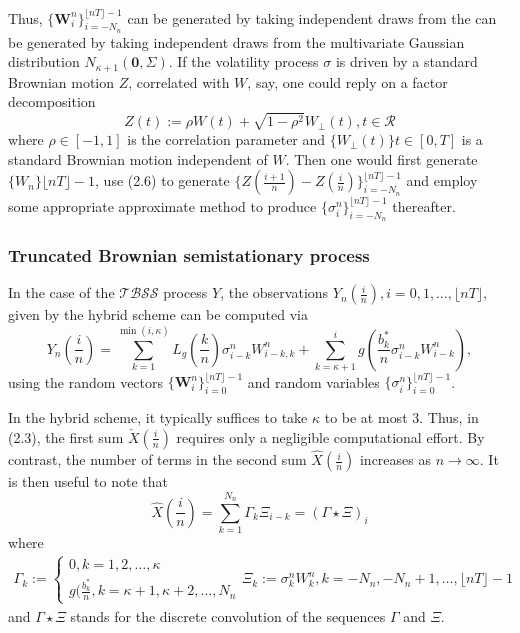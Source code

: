 \documentclass[12pt]{article}
\numberwithin{equation}{section}
\begin{document}
Thus, $\{\bm{W}_i^n\}_{i=-N_n}^{\lfloor nT \rfloor -1}$ can be generated by taking independent draws from the can be generated by taking independent draws from the multivariate Gaussian distribution $N_{\kappa+1}(\bm{0}, \Sigma)$. If the volatility process $\sigma$ is driven by a standard Brownian motion $Z$, correlated with $W$, say, one could reply on a factor decomposition 
\begin{equation}
  Z(t) := \rho W(t) + \sqrt{1-\rho^2} W_\bot (t), t\in\mathcal{R}
\end{equation}
where $\rho \in [-1,1]$ is the correlation parameter and $\{W_\bot(t)\}t\in[0,T]$ is a standard Brownian motion independent of $W$. Then one would first generate $\{W_n\}\lfloor nT\rfloor-1$, use (2.6) to generate $\{Z(\frac{i+1}{n}) - Z(\frac{i}{n})\}_{i=-N_n}^{\lfloor nT\rfloor-1}$ and employ some appropriate approximate method to produce $\{\sigma_i^n\}_{i=-N_n}^{\lfloor nT\rfloor-1}$ thereafter.

\subsubsection{Truncated Brownian semistationary process}
    
In the case of the $\mathcal{TBSS}$ process $Y$, the observations $Y_n(\frac{i}{n}), i=0,1,\dots,\lfloor nT \rfloor$, given by the hybrid scheme can be computed via
\begin{equation}
  Y_n(\frac{i}{n}) = \sum_{k=1}^{\min(i,\kappa)}L_g(\frac{k}{n})\sigma_{i-k}^nW_{i-k,k}^n + \sum_{k=\kappa+1}^{i} g(\frac{b_k^*}{n}\sigma_{i-k}^nW_{i-k}^n),
\end{equation}
using the random vectors $\{\bm{W}_i^n\}_{i=0}^{\lfloor nT \rfloor-1}$ and random variables $\{\sigma_i^n\}_{i=0}^{\lfloor nT\rfloor-1}$.

In the hybrid scheme, it typically suffices to take $\kappa$ to be at most 3. Thus, in (2.3), the first sum $\check{X}(\frac{i}{n})$ requires only a negligible computational effort. By contrast, the number of terms in the second sum $\hat{X}(\frac{i}{n})$ increases as $n\rightarrow\infty$. It is then useful to note that
\begin{equation}
  \hat{X}(\frac{i}{n}) = \sum_{k=1}^{N_n} \Gamma_k \Xi_{i-k} = (\Gamma\star\Xi)_i
\end{equation}
where
\begin{equation}
  \begin{split}
    \Gamma_k := \begin{cases}
      0, k=1,2,\dots,\kappa \\
      g(\frac{b_k^*}{n}, k = \kappa+1,\kappa+2,\dots,N_n
    \end{cases}
    \Xi_k := \sigma_k^nW_k^n, k = -N_n, -N_n+1, \dots, \lfloor nT \rfloor - 1
  \end{split}
\end{equation}
and $\Gamma\star\Xi$ stands for the discrete convolution of the sequences $\Gamma$ and $\Xi$.
        
\end{document}
